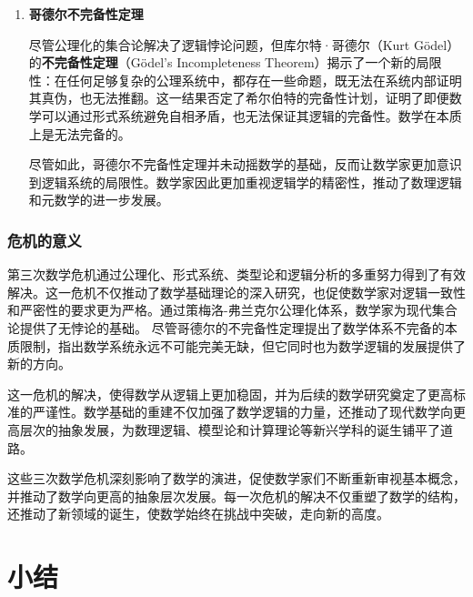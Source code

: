 \begin{enumerate}
ZF集合论不仅为集合论奠定了坚实的基础，还成为了现代数学中集合论的标准体系。通过公理化的方式，数学家能够在逻辑上避免悖论，同时也确保了数学体系的逻辑一致性和严格性。
\textcolor{red}{举个例子}

\item {\bf 哥德尔不完备性定理}

尽管公理化的集合论解决了逻辑悖论问题，但库尔特·哥德尔（Kurt Gödel）的{\bf 不完备性定理}（Gödel's Incompleteness Theorem）揭示了一个新的局限性：在任何足够复杂的公理系统中，都存在一些命题，既无法在系统内部证明其真伪，也无法推翻。这一结果否定了希尔伯特的完备性计划，证明了即便数学可以通过形式系统避免自相矛盾，也无法保证其逻辑的完备性。数学在本质上是无法完备的。

尽管如此，哥德尔不完备性定理并未动摇数学的基础，反而让数学家更加意识到逻辑系统的局限性。数学家因此更加重视逻辑学的精密性，推动了数理逻辑和元数学的进一步发展。
\end{enumerate}

\subsubsection{危机的意义}

第三次数学危机通过公理化、形式系统、类型论和逻辑分析的多重努力得到了有效解决。这一危机不仅推动了数学基础理论的深入研究，也促使数学家对逻辑一致性和严密性的要求更为严格。通过策梅洛-弗兰克尔公理化体系，数学家为现代集合论提供了无悖论的基础。
尽管哥德尔的不完备性定理提出了数学体系不完备的本质限制，指出数学系统永远不可能完美无缺，但它同时也为数学逻辑的发展提供了新的方向。

这一危机的解决，使得数学从逻辑上更加稳固，并为后续的数学研究奠定了更高标准的严谨性。数学基础的重建不仅加强了数学逻辑的力量，还推动了现代数学向更高层次的抽象发展，为数理逻辑、模型论和计算理论等新兴学科的诞生铺平了道路。

这些三次数学危机深刻影响了数学的演进，促使数学家们不断重新审视基本概念，并推动了数学向更高的抽象层次发展。每一次危机的解决不仅重塑了数学的结构，还推动了新领域的诞生，使数学始终在挑战中突破，走向新的高度。
\section{小结}

